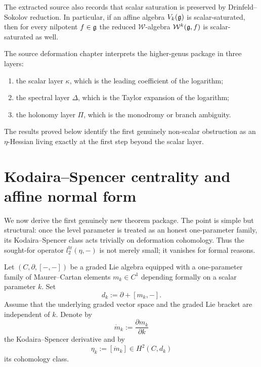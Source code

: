 \begin{framework}
\label{frw:ds-functoriality}
The extracted source also records that scalar saturation is preserved by
Drinfeld--Sokolov reduction.  In particular, if an affine algebra
$V_k(\mathfrak{g})$ is scalar-saturated, then for every nilpotent $f\in\mathfrak{g}$ the reduced
$\mathcal{W}$-algebra $\mathcal{W}^k(\mathfrak{g},f)$ is scalar-saturated as well.
\end{framework}

\begin{summary}
\label{sum:scalar-spectral-holonomy}
The source deformation chapter interprets the higher-genus package in three
layers:
\begin{enumerate}[label=\textup{(\roman*)}]
\item the scalar layer $\kappa$, which is the leading coefficient of the
logarithm;
\item the spectral layer $\Delta$, which is the Taylor expansion of the
logarithm;
\item the holonomy layer $\Pi$, which is the monodromy or branch ambiguity.
\end{enumerate}
The results proved below identify the first genuinely non-scalar obstruction as
an $\eta$-Hessian living exactly at the first step beyond the scalar layer.
\end{summary}

\section{Kodaira--Spencer centrality and affine normal form}
\label{sec:ks-centrality-affine-normal-form}

We now derive the first genuinely new theorem package.  The point is simple but
structural: once the level parameter is treated as an honest one-parameter
family, its Kodaira--Spencer class acts trivially on deformation cohomology.
Thus the sought-for operator $l_2^{\mathrm{tr}}(\eta,-)$ is not merely small; it
vanishes for formal reasons.

\begin{setup}
\label{setup:one-parameter-dgla}
Let $(C,\partial,[-,-])$ be a graded Lie algebra equipped with a one-parameter
family of Maurer--Cartan elements $m_k\in C^1$ depending formally on a scalar
parameter $k$.  Set
\[
d_k:=\partial+[m_k,-].
\]
Assume that the underlying graded vector space and the graded Lie bracket are
independent of $k$.  Denote by
\[
\dot m_k:=\frac{\partial m_k}{\partial k}
\]
the Kodaira--Spencer derivative and by
\[
\eta_k:=[\dot m_k]\in H^2(C,d_k)
\]
its cohomology class.
\end{setup}

